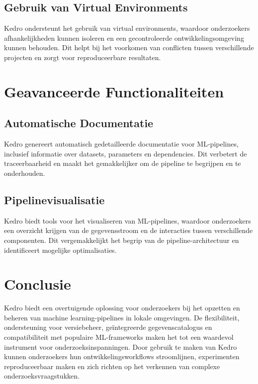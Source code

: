 \subsection{Gebruik van Virtual Environments}
Kedro ondersteunt het gebruik van virtual environments, waardoor onderzoekers afhankelijkheden kunnen isoleren en een gecontroleerde ontwikkelingsomgeving kunnen behouden. Dit helpt bij het voorkomen van conflicten tussen verschillende projecten en zorgt voor reproduceerbare resultaten.

\section{Geavanceerde Functionaliteiten}

\subsection{Automatische Documentatie}
Kedro genereert automatisch gedetailleerde documentatie voor ML-pipelines, inclusief informatie over datasets, parameters en dependencies. Dit verbetert de traceerbaarheid en maakt het gemakkelijker om de pipeline te begrijpen en te onderhouden.

\subsection{Pipelinevisualisatie}
Kedro biedt tools voor het visualiseren van ML-pipelines, waardoor onderzoekers een overzicht krijgen van de gegevensstroom en de interacties tussen verschillende componenten. Dit vergemakkelijkt het begrip van de pipeline-architectuur en identificeert mogelijke optimalisaties.

\section{Conclusie}

Kedro biedt een overtuigende oplossing voor onderzoekers bij het opzetten en beheren van machine learning-pipelines in lokale omgevingen. De flexibiliteit, ondersteuning voor versiebeheer, geïntegreerde gegevenscatalogus en compatibiliteit met populaire ML-frameworks maken het tot een waardevol instrument voor onderzoeksinspanningen. Door gebruik te maken van Kedro kunnen onderzoekers hun ontwikkelingsworkflows stroomlijnen, experimenten reproduceerbaar maken en zich richten op het verkennen van complexe onderzoeksvraagstukken.
